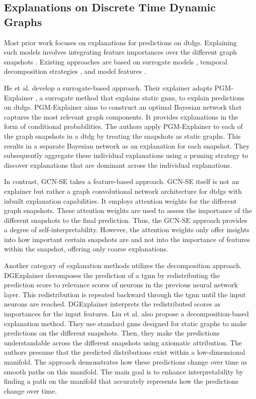 \subsection{Explanations on Discrete Time Dynamic Graphs}
\label{s_relatedWork_DTDG}

Most prior work focuses on explanations for predictions on \glspl{dtdg}. Explaining such models involves integrating feature importances over the different graph snapshots \cite{he_explainer_2022}. Existing approaches are based on surrogate models \cite{he_explainer_2022}, temporal decomposition strategies \cite{xie_explaining_2022, liu_differential_2023}, and model features \cite{fan_gcn-se_2021}.


He et al. \cite{he_explainer_2022} develop a surrogate-based approach. Their explainer adapts PGM-Explainer \cite{vu_pgm-explainer_2020}, a surrogate method that explains static \glspl{gnn}, to explain predictions on \glspl{dtdg}. PGM-Explainer aims to construct an optimal Bayesian network that captures the most relevant graph components. It provides explanations in the form of conditional probabilities. The authors apply PGM-Explainer to each of the graph snapshots in a \gls{dtdg} by treating the snapshots as static graphs. This results in a separate Bayesian network as an explanation for each snapshot. They subsequently aggregate these individual explanations using a pruning strategy to discover explanations that are dominant across the individual explanations.

In contrast, GCN-SE \cite{fan_gcn-se_2021} takes a feature-based approach. GCN-SE itself is not an explainer but rather a graph convolutional network architecture for \glspl{dtdg} with inbuilt explanation capabilities. It employs attention weights for the different graph snapshots. These attention weights are used to assess the importance of the different snapshots to the final prediction. Thus, the GCN-SE approach provides a degree of self-interpretability. However, the attention weights only offer insights into how important certain snapshots are and not into the importance of features within the snapshot, offering only coarse explanations.

Another category of explanation methods utilizes the decomposition approach. DGExplainer \cite{xie_explaining_2022} decomposes the prediction of a \gls{tgnn} by redistributing the prediction score to relevance scores of neurons in the previous neural network layer. This redistribution is repeated backward through the \gls{tgnn} until the input neurons are reached. DGExplainer interprets the redistributed scores as importances for the input features. Liu et al. \cite{liu_differential_2023} also propose a decomposition-based explanation method. They use standard \glspl{gnn} designed for static graphs to make predictions on the different snapshots. Then, they make the predictions understandable across the different snapshots using axiomatic attribution. The authors presume that the predicted distributions exist within a low-dimensional manifold. The approach demonstrates how these predictions change over time as smooth paths on this manifold. The main goal is to enhance interpretability by finding a path on the manifold that accurately represents how the predictions change over time.



